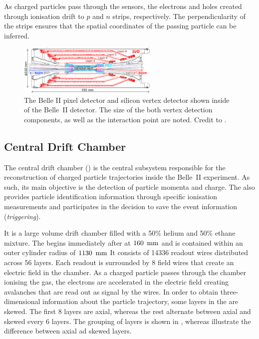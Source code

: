 As charged particles pass through the \SVD sensors, the electrons and holes created through ionisation drift to $p$ and $n$ strips, respectively.
The perpendicularity of the strips ensures that the spatial coordinates of the passing particle can be inferred.

\begin{figure}[htbp!]
    \centering
    \includegraphics[width=0.6\textwidth]{figures/experimental_setup/vxd.png}
    \caption{\label{fig:vxd}
    The Belle II pixel detector and silicon vertex detector shown inside of the Belle~II detector.
    The size of the both vertex detection components, as well as the interaction point are noted.
    Credit to \cite{Belle-IISVD:2023mxk}.
    }
\end{figure}

\subsection{Central Drift Chamber}\label{sec:cdc}

The central drift chamber (\CDC) \cite{Taniguchi:2017not} is the central subsystem responsible for the reconstruction of charged particle trajectories inside the Belle~II experiment.
As such, its main objective is the detection of particle momenta and charge.
The \CDC also provides particle identification information through specific ionisation measurements
and participates in the decision to save the event information (\textit{triggering}).

It is a large volume drift chamber filled with a 50\% helium and 50\% ethane mixture.
The \CDC begins immediately after \SVD at $160~{\rm \,mm}$ and is contained within an outer cylinder radius of $1130~{\rm \,mm}$
It consists of 14336 readout wires distributed across 56 layers.
Each readout is surrounded by 8 field wires that create an electric field in the chamber.
As a charged particle passes through the chamber ionising the gas,
the electrons are accelerated in the electric field creating avalanches that are read out as signal by the wires.
In order to obtain three-dimensional information about the particle trajectory,
some layers in the \CDC are skewed.
The first 8 layers are axial, whereas the rest alternate between axial and skewed every 6 layers.
The grouping of layers is shown in , whereas  illustrate the difference between axial ad skewed layers.


